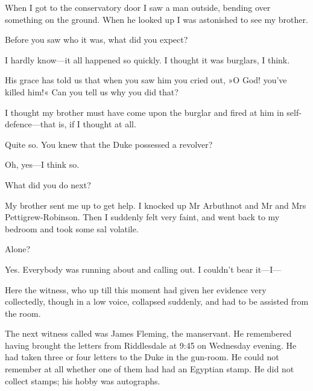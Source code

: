 \begin{dialogue}
  When I got to the conservatory door I saw a man outside, bending over something on the ground. When he looked up I was astonished to see my brother.

 Before you saw who it was, what did you expect?

 I hardly know\allowbreak---\allowbreak it all happened so quickly. I thought it was burglars, I think.

 His grace has told us that when you saw him you cried out, »O God! you've killed him!« Can you tell us why you did that?

  I thought my brother must have come upon the burglar and fired at him in self-defence\allowbreak---\allowbreak that is, if I thought at all.

 Quite so. You knew that the Duke possessed a revolver?

 Oh, yes\allowbreak---\allowbreak I think so.

 What did you do next?

 My brother sent me up to get help. I knocked up Mr Arbuthnot and Mr and Mrs Pettigrew-Robinson. Then I suddenly felt very faint, and went back to my bedroom and took some sal volatile.

 Alone?

 Yes. Everybody was running about and calling out. I couldn't bear it\allowbreak---\allowbreak I---
\end{dialogue}

Here the witness, who up till this moment had given her evidence very collectedly, though in a low voice, collapsed suddenly, and had to be assisted from the room.


The next witness called was James Fleming, the manservant. He remembered having brought the letters from Riddlesdale at 9:45 on Wednesday evening. He had taken three or four letters to the Duke in the gun-room. He could not remember at all whether one of them had had an Egyptian stamp. He did not collect stamps; his hobby was autographs.

